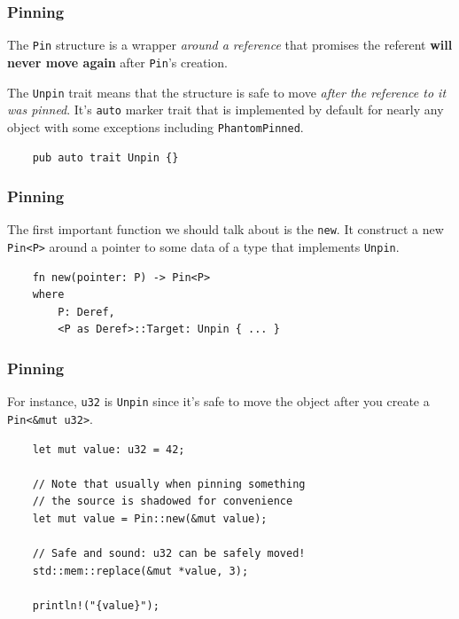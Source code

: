 \documentclass[aspectratio=1610,t]{beamer}
\begin{document}
\begin{frame}[fragile]
\frametitle{Pinning}
The \texttt{Pin} structure is a wrapper \textit{around a reference} that promises the referent \textbf{will never move again} after \texttt{Pin}'s creation.

The \texttt{Unpin} trait means that the structure is safe to move \textit{after the reference to it was pinned}. It's \texttt{auto} marker trait that is implemented by default for nearly any object with some exceptions including \texttt{PhantomPinned}.

\begin{verbatim}
    pub auto trait Unpin {}
\end{verbatim}
\end{frame}


\begin{frame}[fragile]
\frametitle{Pinning}
The first important function we should talk about is the \texttt{new}. It construct a new \texttt{Pin<P>} around a pointer to some data of a type that implements \texttt{Unpin}.

\begin{verbatim}
    fn new(pointer: P) -> Pin<P>
    where
        P: Deref,
        <P as Deref>::Target: Unpin { ... }
\end{verbatim}
\end{frame}


\begin{frame}[fragile]
\frametitle{Pinning}
For instance, \texttt{u32} is \texttt{Unpin} since it's safe to move the object after you create a \texttt{Pin<\&mut u32>}.

\begin{verbatim}
    let mut value: u32 = 42;

    // Note that usually when pinning something
    // the source is shadowed for convenience
    let mut value = Pin::new(&mut value);

    // Safe and sound: u32 can be safely moved!
    std::mem::replace(&mut *value, 3);

    println!("{value}");
\end{verbatim}
\end{frame}

\end{document}
